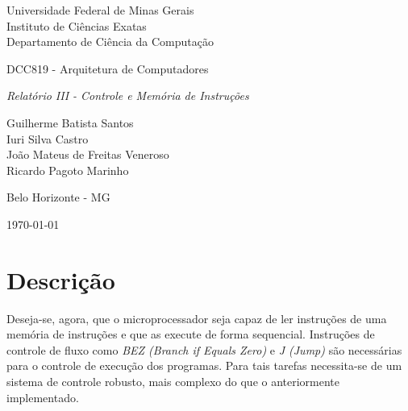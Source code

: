 \documentclass[11pt,a4paper,titlepage]{article}
\newcommand{\titulo}{\textit{Relatório III - Controle e Memória de Instruções}}
\begin{document}
\begin{titlepage}
\begin{center}

\begin{large}
Universidade Federal de Minas Gerais\\
Instituto de Ciências Exatas\\
Departamento de Ciência da Computação\\
\end{large}

\vspace{20mm}

\begin{Large}
DCC819 - Arquitetura de Computadores
\end{Large}

\vspace{20mm}

\begin{LARGE}
\titulo
\end{LARGE}


\vspace{30mm}

\begin{Large}
\begin{center}
Guilherme Batista Santos\\ Iuri Silva Castro\\ João Mateus de Freitas Veneroso\\ Ricardo Pagoto Marinho \\
\end{center}
\end{Large}


\vspace{60mm}

{\sc Belo Horizonte - MG}

{\sc \today}

\end{center}
\end{titlepage}


\section{Descrição}\label{sec:desc}

Deseja-se, agora, que o microprocessador seja capaz de ler instruções de uma memória de instruções e que as execute de forma sequencial. Instruções de controle de fluxo como \textit{BEZ (Branch if Equals Zero)} e \textit{J (Jump)} são necessárias para o controle de execução dos programas. Para tais tarefas necessita-se de um sistema de controle robusto, mais complexo do que o anteriormente implementado. 
\end{document}
